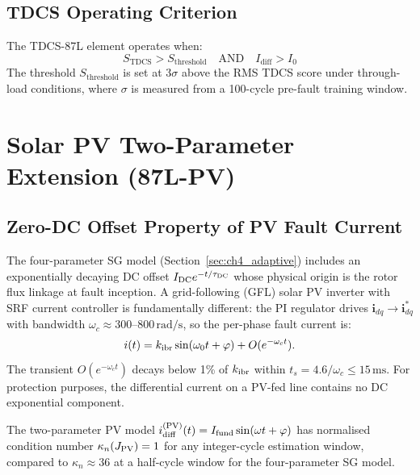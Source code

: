 \subsection{TDCS Operating Criterion}

The TDCS-87L element operates when:
\begin{equation}
  S_\mathrm{TDCS} > S_\mathrm{threshold}
  \quad\text{AND}\quad
  I_\mathrm{diff} > I_0
  \label{eq:ch4_tdcs_criterion}
\end{equation}
The threshold $S_\mathrm{threshold}$ is set at 3$\sigma$ above the RMS
TDCS score under through-load conditions, where $\sigma$ is measured from
a 100-cycle pre-fault training window.

\section{Solar PV Two-Parameter Extension (87L-PV)}
\label{sec:ch4_pv}

\subsection{Zero-DC Offset Property of PV Fault Current}
\label{sec:ch4_pv_model}

The four-parameter SG model (Section~\ref{sec:ch4_adaptive}) includes an
exponentially decaying DC offset $I_{\rm DC}e^{-t/\tau_{\rm DC}}$ whose
physical origin is the rotor flux linkage at fault inception.  A grid-following
(GFL) solar PV inverter with SRF current controller is fundamentally different:
the PI regulator drives $\mathbf{i}_{dq} \to \mathbf{i}_{dq}^*$ with bandwidth
$\omega_c \approx 300$--$800\,\text{rad/s}$, so the per-phase fault current is:
\begin{equation}
  i(t) = k_{\mathrm{ibr}} \sin(\omega_0 t + \varphi) + O(e^{-\omega_c t}).
  \label{eq:ch4_pv_current}
\end{equation}
The transient $O(e^{-\omega_c t})$ decays below 1\% of $k_{\mathrm{ibr}}$ within
$t_s = 4.6/\omega_c \leq 15\,\text{ms}$.  For protection purposes, the
differential current on a PV-fed line contains no DC exponential component.

\begin{proposition}
  \label{prop:ch4_pv_kappa}
  The two-parameter PV model $i_{\rm diff}^{({\rm PV})}(t) = I_{\rm fund}\sin(\omega t + \varphi)$
  has normalised condition number $\kappa_n(J_{\rm PV}) = 1$ for any integer-cycle
  estimation window, compared to $\kappa_n \approx 36$ at a half-cycle window
  for the four-parameter SG model.
\end{proposition}

